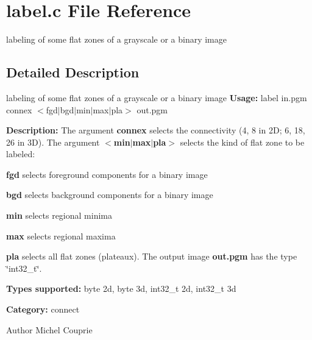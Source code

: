 \section{label.c File Reference}
\label{label_8c}


labeling of some flat zones of a grayscale or a binary image  




\subsection{Detailed Description}
labeling of some flat zones of a grayscale or a binary image {\bfseries Usage:} label in.pgm connex $<$fgd$|$bgd$|$min$|$max$|$pla$>$ out.pgm

{\bfseries Description:} The argument {\bfseries connex} selects the connectivity (4, 8 in 2D; 6, 18, 26 in 3D). The argument {\bfseries $<$min$|$max$|$pla$>$} selects the kind of flat zone to be labeled: \begin{DoxyItemize}
\item {\bfseries fgd} selects foreground components for a binary image \item {\bfseries bgd} selects background components for a binary image \item {\bfseries min} selects regional minima \item {\bfseries max} selects regional maxima \item {\bfseries pla} selects all flat zones (plateaux). The output image {\bfseries out.pgm} has the type \char`\"{}int32\_\-t\char`\"{}.\end{DoxyItemize}
{\bfseries Types supported:} byte 2d, byte 3d, int32\_\-t 2d, int32\_\-t 3d

{\bfseries Category:} connect

\begin{DoxyAuthor}{Author}
Michel Couprie 
\end{DoxyAuthor}
